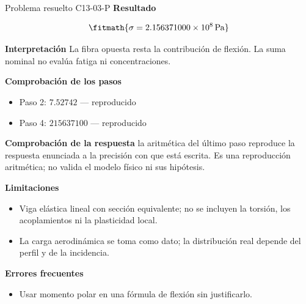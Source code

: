 \documentclass[10pt,openany]{book}
\begin{document}
\begin{studiumworked}{Problema resuelto C13-03-P}
\noindent\textbf{Resultado}

\[
\fitmath{\sigma=2.156371000\times10^{8}\,\mathrm{Pa}}
\]

\noindent\textbf{Interpretación}
La fibra opuesta resta la contribución de flexión. La suma nominal no evalúa fatiga ni concentraciones.

\noindent\textbf{Comprobación de los pasos}
\begin{itemize}
\item Paso 2: $7.52742$ — reproducido
\item Paso 4: $215637100$ — reproducido
\end{itemize}

\noindent\textbf{Comprobación de la respuesta} la aritmética del último paso reproduce la respuesta enunciada a la precisión con que está escrita. Es una reproducción aritmética; no valida el modelo físico ni sus hipótesis.

\noindent\textbf{Limitaciones}
\begin{itemize}
\item Viga elástica lineal con sección equivalente; no se incluyen la torsión, los acoplamientos ni la plasticidad local.
\item La carga aerodinámica se toma como dato; la distribución real depende del perfil y de la incidencia.
\end{itemize}

\noindent\textbf{Errores frecuentes}
\begin{itemize}
\item Usar momento polar en una fórmula de flexión sin justificarlo.
\end{itemize}
\end{studiumworked}
\end{document}
